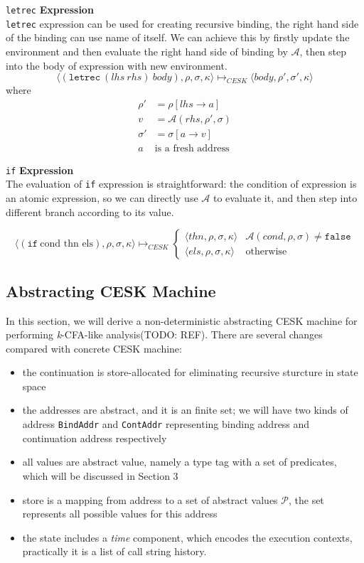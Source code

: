 \documentclass[paper=a4, fontsize=11pt]{scrartcl} %
\numberwithin{equation}{section} %
\numberwithin{figure}{section} %
\numberwithin{table}{section} %
\begin{document}
\texttt{letrec} \textbf{Expression}\\
\texttt{letrec} expression can be used for creating recursive binding, the right hand side of the binding can use name of itself. We can achieve this by firstly update the environment and then evaluate the right hand side of binding by $\mathcal{A}$, then step into the body of expression with new environment.
$$ \langle (\texttt{letrec}~(lhs~rhs)~body), \rho, \sigma, \kappa \rangle \longmapsto_{CESK} \langle body, \rho', \sigma', \kappa \rangle $$
where
\begin{align*}
\rho' & = \rho[lhs \rightarrow a] \\
v & = \mathcal{A}(rhs, \rho', \sigma) \\
\sigma' & = \sigma[a \rightarrow v] \\
a~&\mbox{is a fresh address}
\end{align*}

\texttt{if} \textbf{Expression}\\
The evaluation of \texttt{if} expression is straightforward: the condition of expression is an atomic expression, so we can directly use $\mathcal{A}$ to evaluate it, and then step into different branch according to its value.

$$ \langle (\texttt{if}~\text{cond thn els}), \rho, \sigma, \kappa \rangle \longmapsto_{CESK} 
\begin{cases}
\langle thn, \rho, \sigma, \kappa \rangle & \mathcal{A}(cond, \rho, \sigma) \neq \texttt{false}
\\
\langle els, \rho, \sigma, \kappa \rangle & \text{otherwise}
\end{cases}$$


\subsection{Abstracting CESK Machine}

In this section, we will derive a non-deterministic abstracting CESK machine for performing \textit{k}-CFA-like analysis(TODO: REF). There are several changes compared with concrete CESK machine: 

\begin{itemize}
\item the continuation is store-allocated for eliminating recursive sturcture in state space
\item the addresses are abstract, and it is an finite set; we will have two kinds of address \texttt{BindAddr} and \texttt{ContAddr} representing binding address and continuation address respectively
\item all values are abstract value, namely a type tag with a set of predicates, which will be discussed in Section 3
\item store is a mapping from address to a set of abstract values $\mathcal{P}$, the set represents all possible values for this address
\item the state includes a \textit{time} component, which encodes the execution contexts, practically it is a list of call string history.
\end{itemize}
\end{document}
